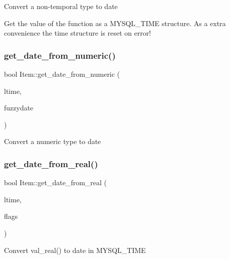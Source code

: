 Convert a non-\/temporal type to date

Get the value of the function as a M\+Y\+S\+Q\+L\+\_\+\+T\+I\+ME structure. As a extra convenience the time structure is reset on error! \mbox{\label{classItem_a8afea7f26f856cb2f7f0019134ab6cba}} 
\subsubsection{\texorpdfstring{get\+\_\+date\+\_\+from\+\_\+numeric()}{get\_date\_from\_numeric()}}
{\footnotesize\ttfamily bool Item\+::get\+\_\+date\+\_\+from\+\_\+numeric (\begin{DoxyParamCaption}\item[{M\+Y\+S\+Q\+L\+\_\+\+T\+I\+ME $\ast$}]{ltime,  }\item[{my\+\_\+time\+\_\+flags\+\_\+t}]{fuzzydate }\end{DoxyParamCaption})\hspace{0.3cm}{\ttfamily [protected]}}

Convert a numeric type to date \mbox{\label{classItem_ae98d037636216e49bc5668606e2734ee}} 
\subsubsection{\texorpdfstring{get\+\_\+date\+\_\+from\+\_\+real()}{get\_date\_from\_real()}}
{\footnotesize\ttfamily bool Item\+::get\+\_\+date\+\_\+from\+\_\+real (\begin{DoxyParamCaption}\item[{M\+Y\+S\+Q\+L\+\_\+\+T\+I\+ME $\ast$}]{ltime,  }\item[{my\+\_\+time\+\_\+flags\+\_\+t}]{flags }\end{DoxyParamCaption})\hspace{0.3cm}{\ttfamily [protected]}}

Convert val\+\_\+real() to date in M\+Y\+S\+Q\+L\+\_\+\+T\+I\+ME \mbox{\label{classItem_ab1a8a02f43971655c32eb669de6ccedc}} 
